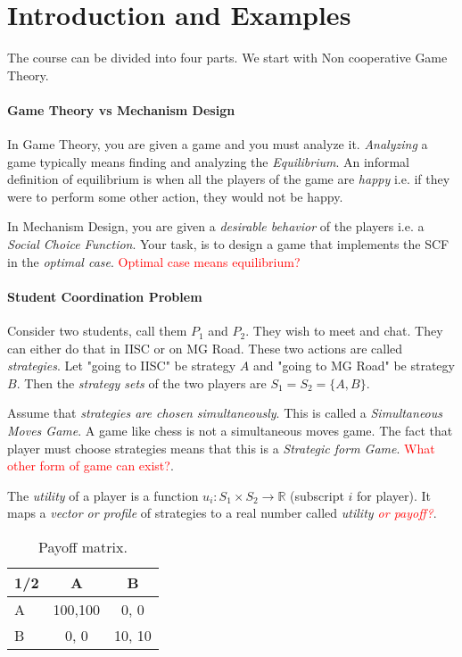 \section{Introduction and Examples}
The course can be divided into four parts. We start with Non cooperative Game Theory.

\paragraph{Game Theory vs Mechanism Design}
In Game Theory, you are given a game and you must analyze it. \textit{Analyzing} a game typically means finding and analyzing the \textit{Equilibrium}. An informal definition of equilibrium is when all the players of the game are \textit{happy} i.e. if they were to perform some other action, they would not be happy. 

In Mechanism Design, you are given a \textit{desirable behavior} of the players i.e. a \textit{Social Choice Function}. Your task, is to design a game that implements the SCF in the \textit{optimal case}. \textcolor{red}{Optimal case means equilibrium?}

\paragraph{Student Coordination Problem}
Consider two students, call them $P_1$ and $P_2$. They wish to meet and chat. They can either do that in IISC or on MG Road. These two actions are called \textit{strategies}. Let "going to IISC" be strategy $A$ and "going to MG Road" be strategy $B$. Then the \textit{strategy sets} of the two players are $S_1 = S_2 = \{A, B\}$. 

Assume that \textit{strategies are chosen simultaneously}. This is called a \textit{Simultaneous Moves Game}. A game like chess is not a simultaneous moves game. The fact that player must choose strategies means that this is a \textit{Strategic form Game}. \textcolor{red}{What other form of game can exist?}.

The \textit{utility} of a player is a function $u_i: S_1 \times S_2 \to \mathbb{R}$ (subscript $i$ for player). It maps a \textit{vector or profile} of strategies to a real number called \textit{utility \textcolor{red}{or payoff?}}. 

\begin{wraptable}{r}{5cm}
	\begin{tabular}{lcc}
		\toprule
		1/2 & A & B\\
		\midrule
		A & 100,100 & 0, 0 \\
		B & 0, 0    & 10, 10\\
		\bottomrule
	\end{tabular}
	\caption{Payoff matrix.}
\end{wraptable}

